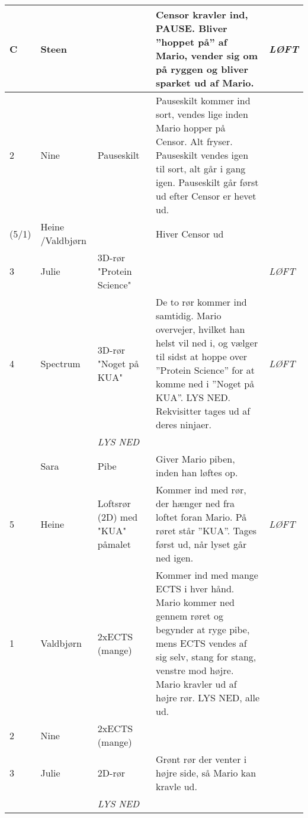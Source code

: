 \documentclass[a4paper,11pt]{article}
\begin{document}
\begin{sketch}
\begin{longtable}{|l||p{2cm}|p{3cm}|p{6.5cm}|p{1.3cm}|}
  C & Steen & & Censor kravler ind, PAUSE. Bliver ”hoppet på” af Mario, vender sig om på ryggen og bliver sparket ud af Mario. & \textit{LØFT} \\ \hline

  2 & Nine & Pauseskilt & Pauseskilt kommer ind sort, vendes lige inden Mario hopper på Censor. Alt fryser. Pauseskilt vendes igen til sort, alt går i gang igen.
  Pauseskilt går først ud efter Censor er hevet ud. & \\ \hline

  (5/1) & Heine /Valdbjørn & & Hiver Censor ud & \\ \hline

  3 & Julie & 3D-rør "Protein Science" & & \textit{LØFT} \\ \hline

  4 & Spectrum & 3D-rør "Noget på KUA" & De to rør kommer ind samtidig. Mario overvejer, hvilket han helst vil ned i, og vælger til sidst at hoppe over ”Protein Science” for at komme ned i ”Noget på KUA”. LYS NED. Rekvisitter tages ud af deres ninjaer. & \textit{LØFT} \\ \hline

  \cellcolor[gray]{0.9} & \cellcolor[gray]{0.9} & \cellcolor[gray]{0.9} \textit{LYS NED} & \cellcolor[gray]{0.9} & \cellcolor[gray]{0.9} \\ \hline

    & Sara & Pibe & Giver Mario piben, inden han løftes op. & \\ \hline

  5 & Heine & Loftsrør (2D) med "KUA" påmalet & Kommer ind med rør, der hænger ned fra loftet foran Mario. På røret står ”KUA”. Tages først ud, når lyset går ned igen. & \textit{LØFT} \\ \hline

  1 & Valdbjørn & 2xECTS (mange) & Kommer ind med mange ECTS i hver hånd.
  Mario kommer ned gennem røret og begynder at ryge pibe, mens ECTS vendes af sig selv, stang for stang, venstre mod højre. Mario kravler ud af højre rør. LYS NED, alle ud. & \\ \hline

  2 & Nine & 2xECTS (mange) & & \\ \hline

  3 & Julie & 2D-rør & Grønt rør der venter i højre side, så Mario kan kravle ud. & \\ \hline

  \cellcolor[gray]{0.9} & \cellcolor[gray]{0.9} & \cellcolor[gray]{0.9} \textit{LYS NED} & \cellcolor[gray]{0.9} & \cellcolor[gray]{0.9} \\ \hline


\end{longtable}
\end{sketch}
\end{document}
